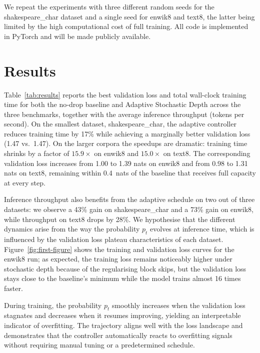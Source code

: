 \documentclass{article} %
\begin{document}
We repeat the experiments with three different random seeds for the shakespeare\_char dataset and a single seed for enwik8 and text8, the latter being limited by the high computational cost of full training.
All code is implemented in PyTorch \citep{paszke2019pytorch} and will be made publicly available.

\section{Results}
\label{sec:results}

Table~\ref{tab:results} reports the best validation loss and total wall-clock training time for both the no‑drop baseline and Adaptive Stochastic Depth across the three benchmarks, together with the average inference throughput (tokens per second). On the smallest dataset, shakespeare\_char, the adaptive controller reduces training time by 17\% while achieving a marginally better validation loss (1.47 vs.\ 1.47). On the larger corpora the speedups are dramatic: training time shrinks by a factor of \(15.9\times\) on enwik8 and \(15.0\times\) on text8. The corresponding validation loss increases from 1.00 to 1.39 nats on enwik8 and from 0.98 to 1.31 nats on text8, remaining within 0.4~nats of the baseline that receives full capacity at every step.

Inference throughput also benefits from the adaptive schedule on two out of three datasets: we observe a 43\% gain on shakespeare\_char and a 73\% gain on enwik8, while throughput on text8 drops by 28\%. We hypothesise that the different dynamics arise from the way the probability \(p_t\) evolves at inference time, which is influenced by the validation loss plateau characteristics of each dataset. Figure~\ref{fig:first-figure} shows the training and validation loss curves for the enwik8 run; as expected, the training loss remains noticeably higher under stochastic depth because of the regularising block skips, but the validation loss stays close to the baseline’s minimum while the model trains almost 16 times faster.

During training, the probability \(p_t\) smoothly increases when the validation loss stagnates and decreases when it resumes improving, yielding an interpretable indicator of overfitting. The trajectory aligns well with the loss landscape and demonstrates that the controller automatically reacts to overfitting signals without requiring manual tuning or a predetermined schedule.
\end{document}
